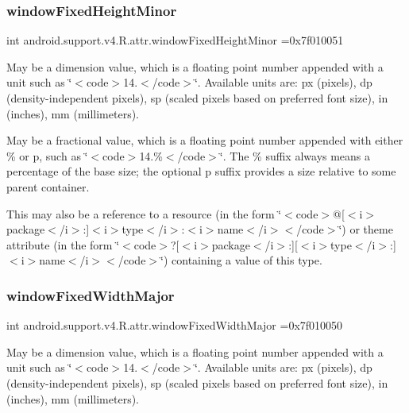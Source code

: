 \subsubsection{\texorpdfstring{window\+Fixed\+Height\+Minor}{windowFixedHeightMinor}}
{\footnotesize\ttfamily int android.\+support.\+v4.\+R.\+attr.\+window\+Fixed\+Height\+Minor =0x7f010051\hspace{0.3cm}{\ttfamily [static]}}

May be a dimension value, which is a floating point number appended with a unit such as \char`\"{}$<$code$>$14.\+5sp$<$/code$>$\char`\"{}. Available units are\+: px (pixels), dp (density-\/independent pixels), sp (scaled pixels based on preferred font size), in (inches), mm (millimeters). 

May be a fractional value, which is a floating point number appended with either \% or p, such as \char`\"{}$<$code$>$14.\%$<$/code$>$\char`\"{}. The \% suffix always means a percentage of the base size; the optional p suffix provides a size relative to some parent container. 

This may also be a reference to a resource (in the form \char`\"{}$<$code$>$@\mbox{[}$<$i$>$package$<$/i$>$\+:\mbox{]}$<$i$>$type$<$/i$>$\+:$<$i$>$name$<$/i$>$$<$/code$>$\char`\"{}) or theme attribute (in the form \char`\"{}$<$code$>$?\mbox{[}$<$i$>$package$<$/i$>$\+:\mbox{]}\mbox{[}$<$i$>$type$<$/i$>$\+:\mbox{]}$<$i$>$name$<$/i$>$$<$/code$>$\char`\"{}) containing a value of this type. \mbox{\label{classandroid_1_1support_1_1v4_1_1R_1_1attr_af5000fa0a4ad63741928b9588aadab35}} 
\subsubsection{\texorpdfstring{window\+Fixed\+Width\+Major}{windowFixedWidthMajor}}
{\footnotesize\ttfamily int android.\+support.\+v4.\+R.\+attr.\+window\+Fixed\+Width\+Major =0x7f010050\hspace{0.3cm}{\ttfamily [static]}}

May be a dimension value, which is a floating point number appended with a unit such as \char`\"{}$<$code$>$14.\+5sp$<$/code$>$\char`\"{}. Available units are\+: px (pixels), dp (density-\/independent pixels), sp (scaled pixels based on preferred font size), in (inches), mm (millimeters). 

